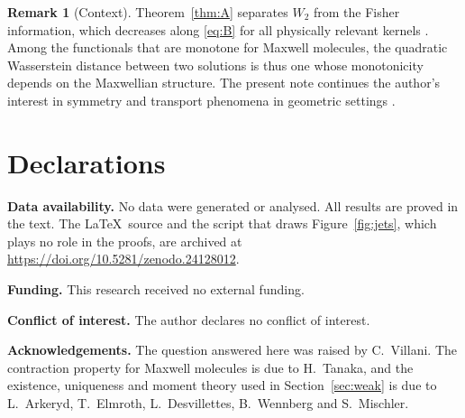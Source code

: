 \documentclass[11pt]{amsart}
\theoremstyle{definition}
\newtheorem{remark}[theorem]{Remark}
\begin{document}
\begin{remark}[Context]
Theorem~\ref{thm:A} separates $W_2$ from the Fisher information, which decreases along \eqref{eq:B} for all physically relevant kernels \cite{ISV25}. Among the functionals that are monotone for Maxwell molecules, the quadratic Wasserstein distance between two solutions is thus one whose monotonicity depends on the Maxwellian structure. The present note continues the author's interest in symmetry and transport phenomena in geometric settings \cite{Bha22a,Bha22b,BSN26}.
\end{remark}

\section*{Declarations}

\noindent\textbf{Data availability.} No data were generated or analysed. All results are proved in the text. The \LaTeX\ source and the script that draws Figure~\ref{fig:jets}, which plays no role in the proofs, are archived at \url{https://doi.org/10.5281/zenodo.24128012}.

\smallskip\noindent\textbf{Funding.} This research received no external funding.

\smallskip\noindent\textbf{Conflict of interest.} The author declares no conflict of interest.

\smallskip\noindent\textbf{Acknowledgements.} The question answered here was raised by C.~Villani. The contraction property for Maxwell molecules is due to H.~Tanaka, and the existence, uniqueness and moment theory used in Section~\ref{sec:weak} is due to L.~Arkeryd, T.~Elmroth, L.~Desvillettes, B.~Wennberg and S.~Mischler.
\end{document}
